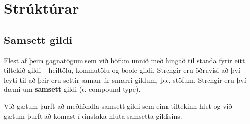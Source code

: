





\chapter{Strúktúrar}
\label{structs}

\section{Samsett gildi}

Flest af þeim gagnatögum sem við höfum unnið með hingað til standa fyrir eitt tiltekið
gildi -- heiltölu, kommutölu og boole gildi.
Strengir eru öðruvísi að því leyti til að þeir eru settir saman úr smærri gildum, þ.e. stöfum.
Strengir eru því dæmi um {\bf samsett} gildi (e. compound type).

Við gætum þurft að meðhöndla samsett gildi sem einn tiltekinn hlut og við gætum þurft að komast í einstaka hluta samsetta gildisins.

